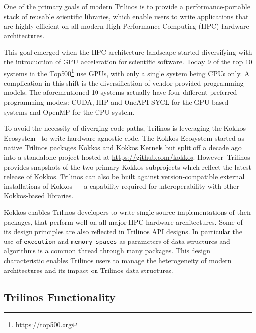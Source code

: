 
One of the primary goals of modern Trilinos is to provide a performance-portable stack of
reusable scientific libraries, which enable users to write applications that are highly
efficient on all modern High Performance Computing (HPC) hardware architectures.

This goal emerged when the HPC architecture landscape started diversifying with the
introduction of GPU acceleration for scientific software. Today 9 of the top 10 systems
in the Top500\footnote{https://top500.org} use GPUs, with only a single system being CPUs only.
A complication in this shift is the diversification of vendor-provided programming models.
The aforementioned 10 systems actually have four different preferred programming models:
CUDA, HIP and OneAPI SYCL for the GPU based systems and OpenMP for the CPU system.

To avoid the necessity of diverging code paths, Trilinos is leveraging the Kokkos Ecosystem~\cite{trott2021kokkos}
to write hardware-agnostic code. The Kokkos Ecosystem started as native Trilinos packages
Kokkos and Kokkos Kernels but split off a decade ago into a standalone project hosted at \url{https://github.com/kokkos}.
However, Trilinos provides snapshots of the two primary Kokkos subprojects which reflect
the latest release of Kokkos. Trilinos can also be built against version-compatible
external installations of Kokkos --- a capability required for interoperability with other
Kokkos-based libraries.

Kokkos enables Trilinos developers to write single source implementations of their packages,
that perform well on all major HPC hardware architectures.
Some of its design principles are also reflected in Trilinos API designs. In particular the
use of \texttt{execution} and \texttt{memory spaces} as parameters of data structures and
algorithms is a common thread through many packages.
This design characteristic enables Trilinos users to manage the heterogeneity of modern architectures
and its impact on Trilinos data structures.

\subsection{Trilinos Functionality}

